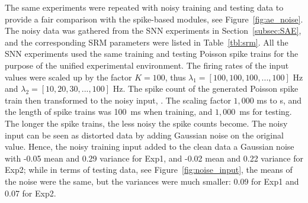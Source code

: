 The same experiments were repeated with noisy training and testing data to provide a fair comparison with the spike-based \DIFdelbegin {}\DIFdelend \DIFaddbegin {}\DIFaddend modules, see Figure~\ref{fig:ae_noise}.
The noisy data was gathered from the SNN experiments in Section~\ref{subsec:SAE}, and the corresponding SRM parameters were listed in Table~\ref{tbl:srm}.
All the SNN experiments used the same training and testing Poisson spike trains for the purpose of the unified experimental environment.
The firing rates of the input values were scaled up by the factor $K = 100$, thus $\lambda_1 = [100, 100, 100, ..., 100]$ Hz and $\lambda_2 = [10, 20, 30, ..., 100]$ Hz.
The spike count \DIFdelbegin {}\DIFdelend \DIFaddbegin {}\DIFaddend of the generated Poisson spike train then transformed to the noisy input, \DIFdelbegin {}\DIFdelend \DIFaddbegin {}\DIFaddend .
The scaling factor $1,000$ \DIFdelbegin {}\DIFdelend \DIFaddbegin {}\DIFaddend ms to s, and the length of spike trains \DIFdelbegin {}\DIFdelend \DIFaddbegin {}\DIFaddend was 100~ms when training, and $1,000$~ms for testing.
The longer the spike trains, the less noisy the spike counts become.
The noisy input can be seen as distorted data by adding Gaussian noise on the original value.
Hence, the noisy training input added to the clean data a Gaussian noise with -0.05 mean and 0.29 variance for Exp1, and -0.02 mean and 0.22 variance for Exp2;
while in terms of testing data, see Figure~\ref{fig:noise_input}, the means of the noise were the same, but the variances were much smaller: 0.09 for Exp1 and 0.07 for Exp2.
